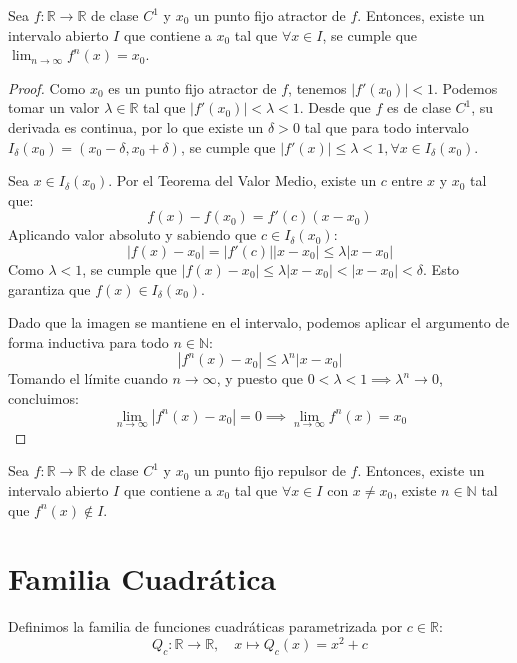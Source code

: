 \begin{teorema}
	Sea $f: \mathbb{R} \to \mathbb{R}$ de clase $C^1$ y $x_0$ un punto fijo atractor de $f$. Entonces, existe un intervalo abierto $I$ que contiene a $x_0$ tal que $\forall x \in I$, se cumple que $\lim_{n \to \infty} f^n(x) = x_0$.
\end{teorema}
\begin{proof}
	Como $x_0$ es un punto fijo atractor de $f$, tenemos $|f'(x_0)| < 1$. Podemos tomar un valor $\lambda \in \mathbb{R}$ tal que $|f'(x_0)| < \lambda < 1$. 
	Desde que $f$ es de clase $C^1$, su derivada es continua, por lo que existe un $\delta > 0$ tal que para todo intervalo $I_\delta(x_0) = (x_0 - \delta, x_0 + \delta)$, se cumple que $|f'(x)| \le \lambda < 1, \forall x \in I_\delta(x_0)$.
	
	Sea $x \in I_\delta(x_0)$. Por el Teorema del Valor Medio, existe un $c$ entre $x$ y $x_0$ tal que:
	$$ f(x) - f(x_0) = f'(c)(x - x_0) $$
	Aplicando valor absoluto y sabiendo que $c \in I_\delta(x_0)$:
	$$ |f(x) - x_0| = |f'(c)| |x - x_0| \le \lambda |x - x_0| $$
	Como $\lambda < 1$, se cumple que $|f(x) - x_0| \le \lambda |x - x_0| < |x - x_0| < \delta$. Esto garantiza que $f(x) \in I_\delta(x_0)$.
	
	Dado que la imagen se mantiene en el intervalo, podemos aplicar el argumento de forma inductiva para todo $n \in \mathbb{N}$:
	$$ |f^n(x) - x_0| \le \lambda^n |x - x_0| $$
	Tomando el límite cuando $n \to \infty$, y puesto que $0 < \lambda < 1 \implies \lambda^n \to 0$, concluimos:
	$$ \lim_{n \to \infty} |f^n(x) - x_0| = 0 \implies \lim_{n \to \infty} f^n(x) = x_0 $$
\end{proof}

\begin{teorema}
	Sea $f: \mathbb{R} \to \mathbb{R}$ de clase $C^1$ y $x_0$ un punto fijo repulsor de $f$. Entonces, existe un intervalo abierto $I$ que contiene a $x_0$ tal que $\forall x \in I$ con $x \neq x_0$, existe $n \in \mathbb{N}$ tal que $f^n(x) \notin I$.
\end{teorema}

\section{Familia Cuadrática}

Definimos la familia de funciones cuadráticas parametrizada por $c \in \mathbb{R}$:
$$ Q_c: \mathbb{R} \to \mathbb{R}, \quad x \mapsto Q_c(x) = x^2 + c $$

